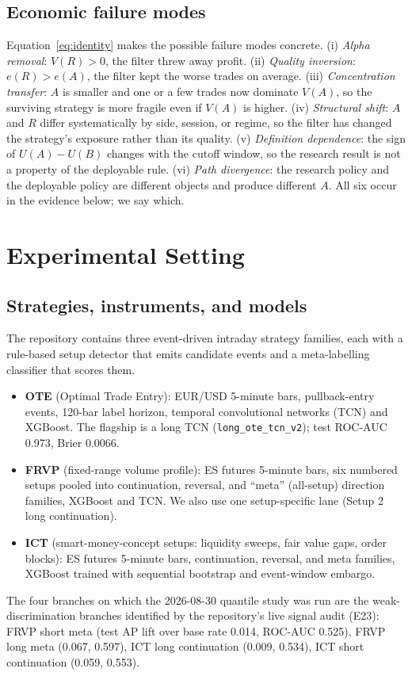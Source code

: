 \documentclass[10pt]{article}
\newcommand{\id}[1]{\texttt{\small #1}}
\begin{document}
\subsection{Economic failure modes}

Equation~\eqref{eq:identity} makes the possible failure modes concrete. (i) \emph{Alpha removal}: $V(R)>0$, the filter threw away profit. (ii) \emph{Quality inversion}: $e(R)>e(A)$, the filter kept the worse trades on average. (iii) \emph{Concentration transfer}: $A$ is smaller and one or a few trades now dominate $V(A)$, so the surviving strategy is more fragile even if $V(A)$ is higher. (iv) \emph{Structural shift}: $A$ and $R$ differ systematically by side, session, or regime, so the filter has changed the strategy's exposure rather than its quality. (v) \emph{Definition dependence}: the sign of $U(A)-U(B)$ changes with the cutoff window, so the research result is not a property of the deployable rule. (vi) \emph{Path divergence}: the research policy and the deployable policy are different objects and produce different $A$. All six occur in the evidence below; we say which.

\section{Experimental Setting}
\label{sec:setting}

\subsection{Strategies, instruments, and models}

The repository contains three event-driven intraday strategy families, each with a rule-based setup detector that emits candidate events and a meta-labelling classifier that scores them.

\begin{itemize}\setlength{\itemsep}{0pt}
\item \textbf{OTE} (Optimal Trade Entry): EUR/USD 5-minute bars, pullback-entry events, 120-bar label horizon, temporal convolutional networks (TCN) and XGBoost. The flagship is a long TCN (\id{long\_ote\_tcn\_v2}); test ROC-AUC 0.973, Brier 0.0066.
\item \textbf{FRVP} (fixed-range volume profile): ES futures 5-minute bars, six numbered setups pooled into continuation, reversal, and ``meta'' (all-setup) direction families, XGBoost and TCN. We also use one setup-specific lane (Setup 2 long continuation).
\item \textbf{ICT} (smart-money-concept setups: liquidity sweeps, fair value gaps, order blocks): ES futures 5-minute bars, continuation, reversal, and meta families, XGBoost trained with sequential bootstrap and event-window embargo.
\end{itemize}
The four branches on which the 2026-08-30 quantile study was run are the weak-discrimination branches identified by the repository's live signal audit (E23): FRVP short meta (test AP lift over base rate 0.014, ROC-AUC 0.525), FRVP long meta (0.067, 0.597), ICT long continuation (0.009, 0.534), ICT short continuation (0.059, 0.553).
\end{document}
